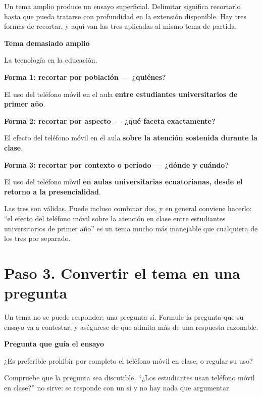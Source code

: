 \documentclass[12pt,a4paper,openany]{report}
\newenvironment{ejemplo}[1]
	{\begin{lrbox}{\cajaguardada}\begin{minipage}{\dimexpr\textwidth-2\fboxsep\relax}\vspace{4pt}\textcolor{verdeejemplo}{\textbf{\sffamily\small #1}}\par\vspace{3pt}\small}
	{\vspace{4pt}\end{minipage}\end{lrbox}\par\vspace{4pt}\noindent\colorbox{cremaejemplo}{\usebox{\cajaguardada}}\par\vspace{8pt}}
\newenvironment{aviso}[1]
	{\begin{lrbox}{\cajaguardada}\begin{minipage}{\dimexpr\textwidth-2\fboxsep\relax}\vspace{4pt}\textbf{\sffamily\small #1}\par\vspace{3pt}\small}
	{\vspace{4pt}\end{minipage}\end{lrbox}\par\vspace{4pt}\noindent\colorbox{grisclaro}{\usebox{\cajaguardada}}\par\vspace{8pt}}
\begin{document}
Un tema amplio produce un ensayo superficial. Delimitar significa recortarlo hasta que pueda tratarse con profundidad en la extensi\'on disponible. Hay tres formas de recortar, y aqu\'i van las tres aplicadas al mismo tema de partida.

\begin{aviso}{Tema demasiado amplio}
La tecnolog\'ia en la educaci\'on.
\end{aviso}

\begin{ejemplo}{Forma 1: recortar por poblaci\'on --- ¿qui\'enes?}
El uso del tel\'efono m\'ovil en el aula \textbf{entre estudiantes universitarios de primer a\~no}.
\end{ejemplo}

\begin{ejemplo}{Forma 2: recortar por aspecto --- ¿qu\'e faceta exactamente?}
El efecto del tel\'efono m\'ovil en el aula \textbf{sobre la atenci\'on sostenida durante la clase}.
\end{ejemplo}

\begin{ejemplo}{Forma 3: recortar por contexto o per\'iodo --- ¿d\'onde y cu\'ando?}
El uso del tel\'efono m\'ovil \textbf{en aulas universitarias ecuatorianas, desde el retorno a la presencialidad}.
\end{ejemplo}

Las tres son v\'alidas. Puede incluso combinar dos, y en general conviene hacerlo: ``el efecto del tel\'efono m\'ovil sobre la atenci\'on en clase entre estudiantes universitarios de primer a\~no'' es un tema mucho m\'as manejable que cualquiera de los tres por separado.

\section{Paso 3. Convertir el tema en una pregunta}

Un tema no se puede responder; una pregunta s\'i. Formule la pregunta que su ensayo va a contestar, y as\'egurese de que admita m\'as de una respuesta razonable.

\begin{ejemplo}{Pregunta que gu\'ia el ensayo}
¿Es preferible prohibir por completo el tel\'efono m\'ovil en clase, o regular su uso?
\end{ejemplo}

Compruebe que la pregunta sea discutible. ``¿Los estudiantes usan tel\'efono m\'ovil en clase?'' no sirve: se responde con un s\'i y no hay nada que argumentar.
\end{document}
